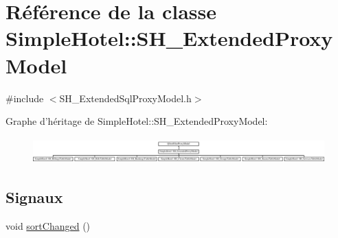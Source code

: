 \hypertarget{classSimpleHotel_1_1SH__ExtendedProxyModel}{\section{Référence de la classe Simple\-Hotel\-:\-:S\-H\-\_\-\-Extended\-Proxy\-Model}
\label{classSimpleHotel_1_1SH__ExtendedProxyModel}
}


{\ttfamily \#include $<$S\-H\-\_\-\-Extended\-Sql\-Proxy\-Model.\-h$>$}

Graphe d'héritage de Simple\-Hotel\-:\-:S\-H\-\_\-\-Extended\-Proxy\-Model\-:\begin{figure}[H]
\begin{center}
\leavevmode
\includegraphics[height=1.016949cm]{classSimpleHotel_1_1SH__ExtendedProxyModel}
\end{center}
\end{figure}
\subsection*{Signaux}
\begin{DoxyCompactItemize}
\item 
void \hyperlink{classSimpleHotel_1_1SH__ExtendedProxyModel_adb9ae03a88cda8d9efbed47527b5186a}{sort\-Changed} ()
\end{DoxyCompactItemize}
